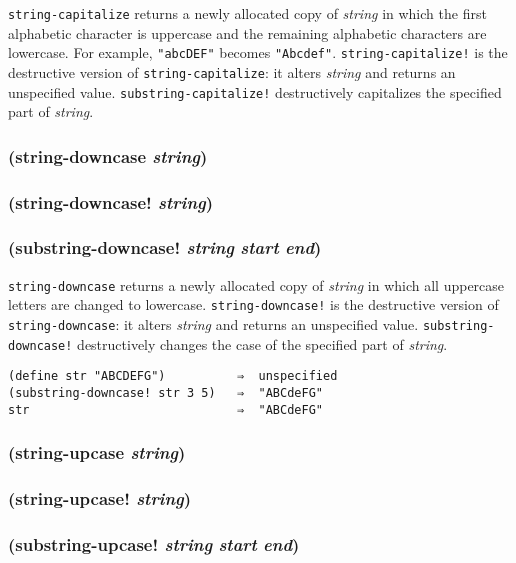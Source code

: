 \documentclass{article}
\begin{document}
\verb|string-capitalize| returns a newly allocated copy of \emph{string} in which the first
alphabetic character is uppercase and the remaining alphabetic characters are lowercase. For
example, \verb|"abcDEF"| becomes \verb|"Abcdef"|. \verb|string-capitalize!| is the
destructive version of \verb|string-capitalize|: it alters \emph{string} and returns an
unspecified value. \verb|substring-capitalize!| destructively capitalizes the specified part
of \emph{string}.

\subsubsection{(string-downcase \emph{string})}

\subsubsection{(string-downcase! \emph{string})}

\subsubsection{(substring-downcase! \emph{string} \emph{start} \emph{end})}

\verb|string-downcase| returns a newly allocated copy of \emph{string} in which all
uppercase letters are changed to lowercase. \verb|string-downcase!| is the destructive
version of \verb|string-downcase|: it alters \emph{string} and returns an unspecified value.
\verb|substring-downcase!| destructively changes the case of the specified part of
\emph{string}.

\begin{verbatim}
(define str "ABCDEFG")          ⇒  unspecified
(substring-downcase! str 3 5)   ⇒  "ABCdeFG"
str                             ⇒  "ABCdeFG"
\end{verbatim}

\subsubsection{(string-upcase \emph{string})}

\subsubsection{(string-upcase! \emph{string})}

\subsubsection{(substring-upcase! \emph{string} \emph{start} \emph{end})}
\end{document}
